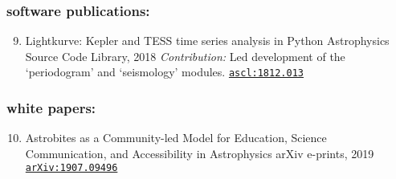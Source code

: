 \documentclass[letterpaper]{k-cv} %
\begin{document}
\subsubsection*{\color{c2}software publications:}
\vspace{-0.2cm}
\begin{enumerate}
	\setcounter{enumi}{8}
	\item {}
	{Lightkurve: Kepler and TESS time series analysis in Python}
	{Astrophysics Source Code Library, 2018}
	{\textit{Contribution:} Led development of the `periodogram' and `seismology' modules.}
	{\texttt{\href{http://ascl.net/1812.013}{ascl:1812.013}}}
\end{enumerate}

\vspace{-0.2cm}
\subsubsection*{\color{c2}white papers:}
\vspace{-0.2cm}
\begin{enumerate}
		\setcounter{enumi}{9}
	\item {}
	{Astrobites as a Community-led Model for Education, Science Communication, and Accessibility in Astrophysics}
	{arXiv e-prints, 2019}
	{\texttt{\href{https://arxiv.org/abs/1907.09496}{arXiv:1907.09496}}}
\end{enumerate}
\end{document}
